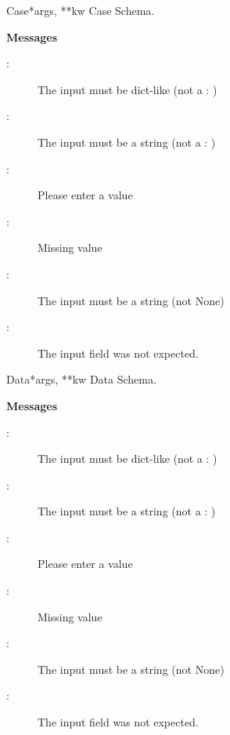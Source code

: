 \documentclass[letterpaper,10pt,english]{manual}
\begin{document}
\hypertarget{webscavator.forms.forms.Case}{}\begin{classdesc}{Case}{*args, **kw}
Case Schema.

\textbf{Messages}
\begin{description}
\item[:]
The input must be dict-like (not a : )

\item[:]
The input must be a string (not a : )

\item[:]
Please enter a value

\item[:]
Missing value

\item[:]
The input must be a string (not None)

\item[:]
The input field  was not expected.

\end{description}
\end{classdesc}

\hypertarget{webscavator.forms.forms.Data}{}\begin{classdesc}{Data}{*args, **kw}
Data Schema.

\textbf{Messages}
\begin{description}
\item[:]
The input must be dict-like (not a : )

\item[:]
The input must be a string (not a : )

\item[:]
Please enter a value

\item[:]
Missing value

\item[:]
The input must be a string (not None)

\item[:]
The input field  was not expected.

\end{description}
\end{classdesc}
\end{document}
